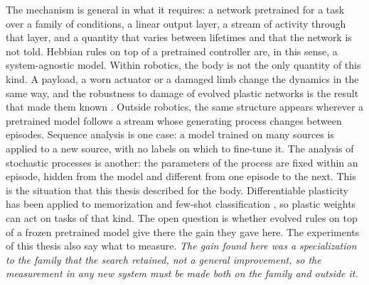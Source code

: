 The mechanism is general in what it requires: a network pretrained for a task over a family of conditions, a linear output layer, a stream of activity through that layer, and a quantity that varies between lifetimes and that the network is not told. Hebbian rules on top of a pretrained controller are, in this sense, a system-agnostic model. Within robotics, the body is not the only quantity of this kind. A payload, a worn actuator or a damaged limb change the dynamics in the same way, and the robustness to damage of evolved plastic networks is the result that made them known \cite{najarro2020meta}. Outside robotics, the same structure appears wherever a pretrained model follows a stream whose generating process changes between episodes. Sequence analysis is one case: a model trained on many sources is applied to a new source, with no labels on which to fine-tune it. The analysis of stochastic processes is another: the parameters of the process are fixed within an episode, hidden from the model and different from one episode to the next. This is the situation that this thesis described for the body. Differentiable plasticity has been applied to memorization and few-shot classification \cite{miconi2018differentiable}, so plastic weights can act on tasks of that kind. The open question is whether evolved rules on top of a frozen pretrained model give there the gain they gave here. The experiments of this thesis also say what to measure. \emph{The gain found here was a specialization to the family that the search retained, not a general improvement, so the measurement in any new system must be made both on the family and outside it.}
